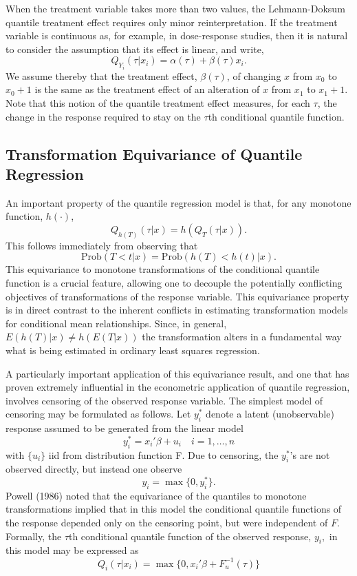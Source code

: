 \documentclass{amsart}
\begin{document}
When the treatment variable takes more than two values, 
the Lehmann-Doksum quantile treatment effect
requires only minor reinterpretation.  
If the treatment variable is continuous as, for example, in
dose-response studies, then it is natural to consider the assumption
that its effect is linear, and write,
$$
Q_{\scriptscriptstyle Y_i}(\tau|x_i) = \alpha(\tau) + \beta(\tau) x_i.
$$
We assume thereby that the treatment effect, $\beta(\tau)$, of changing $x$
from $x_0$ to $x_0+1$ is the same as the treatment effect of an alteration of
$x$ from $x_1$ to $x_1+1.$  
Note that this notion of the quantile treatment effect measures, for
each $\tau$,  the
change in the response required to stay on the $\tau$th conditional quantile
function.  

\subsection{Transformation Equivariance of Quantile Regression}

An important property of the quantile regression model is that,
for any monotone function, $h( \cdot)$, 
\[
Q_{h(T)} (\tau | x) = h( Q_{T} (\tau | x)).
\]
This follows immediately from observing that
\[
\mathrm{Prob}(T < t |x) = \mathrm{Prob}(h(T)<h(t)|x).
\]
This equivariance to monotone transformations of the conditional quantile
function is a crucial feature, allowing one to decouple the potentially
conflicting objectives of transformations of the response variable.
This equivariance property is in direct contrast to the inherent conflicts
in estimating transformation models for conditional mean relationships.
Since, in general, $E(h(T)|x) \not= h(E(T|x))$  the transformation alters
in a fundamental way what is being estimated in ordinary least squares
regression.  
 

A particularly important application of this equivariance result,
and one that has proven extremely influential in the econometric
application of quantile regression, involves censoring of the observed
response variable.  The simplest model of censoring may be formulated as
follows.  Let $y_i^*$ denote a latent (unobservable) response assumed
to be generated from the linear model
\begin{equation*}\label{e.tobit}
y_i^* = x_i'\beta + u_i \quad i=1, \ldots , n
\end{equation*}
with $\{u_i\}$ iid from distribution function  F.
Due to censoring, the $y_i^*$'s are not observed directly, but instead one
observe
\[
y_i = \max \{ 0 , y_i^* \}.
\]
Powell (1986) noted that the equivariance of the quantiles to
monotone transformations implied that in this model the conditional
quantile functions of the response depended only on the censoring point,
but were independent of $F$.  Formally, the $\tau$th
conditional quantile function of the observed response, $y_i,$ in
this model may be expressed as
\begin{equation*} \label{e.crq1}
Q_i (\tau | x_i) = \max \{0, x_i'\beta + F_u^{-1} (\tau) \}
\end{equation*}
\end{document}
